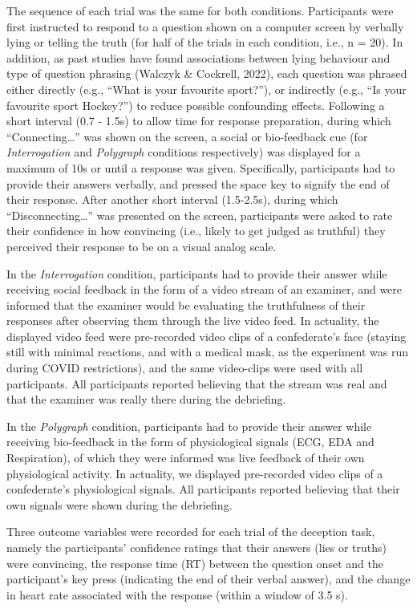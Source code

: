 \documentclass[
  man,mask,floatsintext]{apa6}
\begin{document}
The sequence of each trial was the same for both conditions. Participants were first instructed to respond to a question shown on a computer screen by verbally lying or telling the truth (for half of the trials in each condition, i.e., n = 20). In addition, as past studies have found associations between lying behaviour and type of question phrasing (Walczyk \& Cockrell, 2022), each question was phrased either directly (e.g., ``What is your favourite sport?''), or indirectly (e.g., ``Is your favourite sport Hockey?'') to reduce possible confounding effects. Following a short interval (0.7 - 1.5s) to allow time for response preparation, during which ``Connecting\ldots{}'' was shown on the screen, a social or bio-feedback cue (for \emph{Interrogation} and \emph{Polygraph} conditions respectively) was displayed for a maximum of 10s or until a response was given. Specifically, participants had to provide their answers verbally, and pressed the space key to signify the end of their response. After another short interval (1.5-2.5s), during which ``Disconnecting\ldots{}'' was presented on the screen, participants were asked to rate their confidence in how convincing (i.e., likely to get judged as truthful) they perceived their response to be on a visual analog scale.

In the \emph{Interrogation} condition, participants had to provide their answer while receiving social feedback in the form of a video stream of an examiner, and were informed that the examiner would be evaluating the truthfulness of their responses after observing them through the live video feed. In actuality, the displayed video feed were pre-recorded video clips of a confederate's face (staying still with minimal reactions, and with a medical mask, as the experiment was run during COVID restrictions), and the same video-clips were used with all participants. All participants reported believing that the stream was real and that the examiner was really there during the debriefing.

In the \emph{Polygraph} condition, participants had to provide their answer while receiving bio-feedback in the form of physiological signals (ECG, EDA and Respiration), of which they were informed was live feedback of their own physiological activity. In actuality, we displayed pre-recorded video clips of a confederate's physiological signals. All participants reported believing that their own signals were shown during the debriefing.

Three outcome variables were recorded for each trial of the deception task, namely the participants' confidence ratings that their answers (lies or truths) were convincing, the response time (RT) between the question onset and the participant's key press (indicating the end of their verbal answer), and the change in heart rate associated with the response (within a window of 3.5 s).
\end{document}
